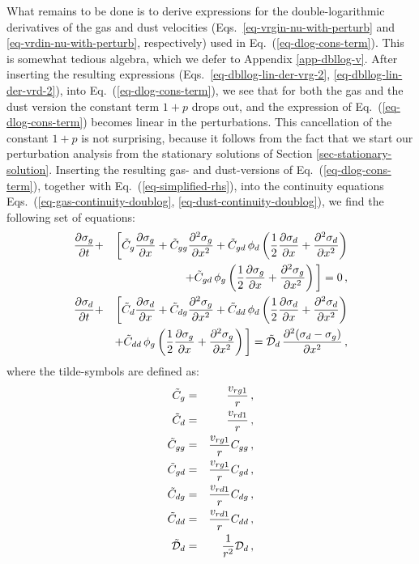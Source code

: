 \documentclass{aa}
\def\comma{\,,}
\begin{document}
What remains to be done is to derive expressions for the double-logarithmic
derivatives of the gas and dust velocities (Eqs.~\ref{eq-vrgin-nu-with-perturb}
and \ref{eq-vrdin-nu-with-perturb}, respectively) used in
Eq.~(\ref{eq-dlog-cons-term}). This is somewhat tedious algebra, which we defer
to Appendix \ref{app-dbllog-v}. After inserting the resulting expressions
(Eqs.~\ref{eq-dbllog-lin-der-vrg-2}, \ref{eq-dbllog-lin-der-vrd-2}), into
Eq.~(\ref{eq-dlog-cons-term}), we see that for both the gas and the dust version
the constant term $1+p$ drops out, and the expression of
Eq.~(\ref{eq-dlog-cons-term}) becomes linear in the perturbations. This
cancellation of the constant $1+p$ is not surprising, because it follows from
the fact that we start our perturbation analysis from the stationary solutions
of Section \ref{sec-stationary-solution}. Inserting the resulting gas- and
dust-versions of Eq.~(\ref{eq-dlog-cons-term}), together with
Eq.~(\ref{eq-simplified-rhs}), into the continuity equations
Eqs.~(\ref{eq-gas-continuity-doublog}, \ref{eq-dust-continuity-doublog}), we
find the following set of equations:
\begin{eqnarray}
  \frac{\partial\sigma_g}{\partial t}
  &+&\bigg[
    \tilde C_g\frac{\partial \sigma_g}{\partial x}
   + \tilde C_{gg}\frac{\partial^2\sigma_g}{\partial x^2}
   + \tilde C_{gd} \,\phi_d\left(
   \frac{1}{2}\frac{\partial\sigma_d}{\partial x} + \frac{\partial^2\sigma_d}{\partial x^2}\right)  \nonumber\\
   & & + \tilde C_{gd} \,\phi_g\left(
  \frac{1}{2}\frac{\partial\sigma_g}{\partial x} + \frac{\partial^2\sigma_g}{\partial x^2}\right)
  \bigg] = 0 \comma\label{eq-cont-gas-lin-2}\\
  \frac{\partial\sigma_d}{\partial t}
  &+&\bigg[
    \tilde C_d\frac{\partial \sigma_d}{\partial x}
   + \tilde C_{dg}\frac{\partial^2\sigma_g}{\partial x^2}
   + \tilde C_{dd} \,\phi_d\left(
  \frac{1}{2}\frac{\partial\sigma_d}{\partial x} + \frac{\partial^2\sigma_d}{\partial x^2}\right) \nonumber\\
& &    + \tilde C_{dd} \,\phi_g\left(
  \frac{1}{2}\frac{\partial\sigma_g}{\partial x} + \frac{\partial^2\sigma_g}{\partial x^2}\right)
  \bigg] =
 \tilde {\cal D}_d\,
    \frac{\partial^2(\sigma_d-\sigma_g)}{\partial x^2} \comma\label{eq-cont-dust-lin-2}
\end{eqnarray}
where the tilde-symbols are defined as:
\begin{eqnarray}
  \tilde C_g &=&\frac{v_{rg1}}{r}\comma\\
  \tilde C_d &=&\frac{v_{rd1}}{r}\comma\\
  \tilde C_{gg} &=& \frac{v_{rg1}}{r}C_{gg} \comma\\
  \tilde C_{gd} &=& \frac{v_{rg1}}{r}C_{gd} \comma\\
  \tilde C_{dg} &=& \frac{v_{rd1}}{r}C_{dg} \comma\\
  \tilde C_{dd} &=& \frac{v_{rd1}}{r}C_{dd} \comma\\
  \tilde {\cal D}_d &=& \frac{1}{r^2}{\cal D}_d\comma
\end{eqnarray}
\end{document}
